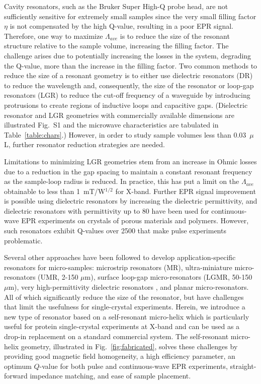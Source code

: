 Cavity resonators, such as the Bruker Super High-Q probe head, are not sufficiently sensitive for extremely small samples since the very small filling factor $\eta$ is not compensated by the high Q-value, resulting in a poor EPR signal. \cite{ReijerseSavitsky2017} Therefore, one way to maximize $\Lambda_{ave}$ is to reduce the size of the resonant structure relative to the sample volume, increasing the filling factor. The challenge arises due to potentially increasing the losses in the system, degrading the Q-value, more than the increase in the filling factor. Two common methods to reduce the size of a resonant geometry is to either use dielectric resonators (DR) to reduce the wavelength and, consequently, the size of the resonator or loop-gap resonators (LGR) to reduce the cut-off frequency of a waveguide by introducing protrusions to create regions of inductive loops and capacitive gaps. (Dielectric resonator and LGR geometries with commercially available dimensions are illustrated Fig.~S1 and the microwave characteristics are tabulated in Table~\ref{table:chars}.) However, in order to study sample volumes less than 0.03~$\mu$L, further resonator reduction strategies are needed.

Limitations to minimizing LGR geometries stem from an increase in Ohmic losses due to a reduction in the gap spacing to maintain a constant resonant frequency as the sample-loop radius is reduced. In practice, this has put a limit on the $\Lambda_{ave}$ obtainable to less than 1~mT/W$^{1/2}$ for X-band. Further EPR signal improvement is possible using dielectric resonators by increasing the dielectric permittivity, and dielectric resonators with permittivity up to 80 have been used for continuous-wave EPR experiments on crystals of porous materials and polymers. \cite{dielectricReson1, dielectricReson2} However, such resonators exhibit Q-values over 2500 that make pulse experiments problematic. \cite{Friedlaender2015} 

Several other approaches have been followed to develop application-specific resonators for micro-samples: microstrip resonators (MR)\cite{Microstrip2009, GhirriMicroStrip}, ultra-miniature micro-resonators (UMR, 2-150 $\mu$m)\cite{AharonBlankUltra2013}, surface loop-gap micro-resonators (LGMR, 50-150 $\mu$m)\cite{AharonSurface2010}, very high-permittivity dielectric resonators \cite{walsh86, GOLOVINA200852}, and planar micro-resonators. \cite{Suter2005, Suter2008, suter2015} All of which significantly reduce the size of the resonator, but have challenges that limit the usefulness for single-crystal experiments. Herein, we introduce a new type of resonator based on a self-resonant micro-helix which is particularly useful for protein single-crystal experiments at X-band and can be used as a drop-in replacement on a standard commercial system. The self-resonant micro-helix geometry, illustrated in Fig.~\ref{fig:fabricated}, solves these challenges by providing good magnetic field homogeneity, a high efficiency parameter, an optimum $Q$-value for both pulse and continuous-wave EPR experiments, straight-forward impedance matching, and ease of sample placement. 

